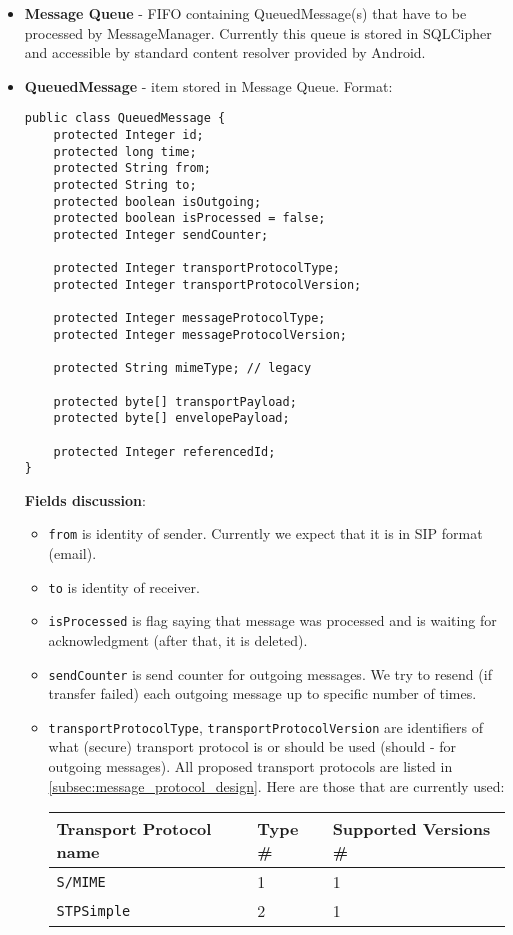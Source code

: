 \documentclass[a4paper,10pt]{article}
\begin{document}
\begin{itemize}
\item \textbf{Message Queue} -  FIFO containing QueuedMessage(s) that have to be processed by MessageManager. Currently this queue is stored in SQLCipher and accessible by standard content resolver provided by Android.

\item \textbf{QueuedMessage} - item stored in Message Queue. Format:
\begin{Verbatim}[frame=single]
public class QueuedMessage {
    protected Integer id;
    protected long time;
    protected String from;
    protected String to;
    protected boolean isOutgoing;
    protected boolean isProcessed = false;
    protected Integer sendCounter;

    protected Integer transportProtocolType;
    protected Integer transportProtocolVersion;

    protected Integer messageProtocolType;
    protected Integer messageProtocolVersion;

    protected String mimeType; // legacy

    protected byte[] transportPayload;
    protected byte[] envelopePayload;    
    
    protected Integer referencedId;
}
\end{Verbatim} 
\textbf{Fields discussion}:
\begin{itemize}
\item \verb#from# is identity of sender. Currently we expect that it is in SIP format (email).
\item \verb#to# is identity of receiver. 
\item \verb#isProcessed# is flag saying that message was processed and is waiting for acknowledgment (after that, it is deleted). 
\item \verb#sendCounter# is send counter for outgoing messages. We try to resend (if transfer failed) each outgoing message up to specific number of times. 
\item \verb#transportProtocolType#, \verb#transportProtocolVersion# are identifiers of what (secure) transport protocol is or should be used (should - for outgoing messages). All proposed transport protocols are listed in \ref{subsec:message_protocol_design}. Here are those that are currently used:

\begin{tabular}{lll}
Transport Protocol name & Type \# & Supported Versions \# \\
\hline
\verb#S/MIME# & 1 & 1 \\
\verb#STPSimple# & 2 & 1
\end{tabular}
\medskip


\end{itemize}
\end{itemize}
\end{document}
